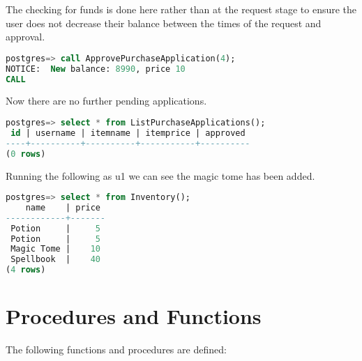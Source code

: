 The checking for funds is done here rather than at the request stage to ensure the user does not decrease their balance between
the times of the request and approval.

\begin{lstlisting}[language=SQL]
postgres=> call ApprovePurchaseApplication(4);
NOTICE:  New balance: 8990, price 10
CALL
\end{lstlisting}

Now there are no further pending applications.

\begin{lstlisting}[language=SQL]
postgres=> select * from ListPurchaseApplications();
 id | username | itemname | itemprice | approved 
----+----------+----------+-----------+----------
(0 rows)
\end{lstlisting}

Running the following as u1 we can see the magic tome has been added.

\begin{lstlisting}[language=SQL]
postgres=> select * from Inventory();
    name    | price 
------------+-------
 Potion     |     5
 Potion     |     5
 Magic Tome |    10
 Spellbook  |    40
(4 rows)
\end{lstlisting}


\section{Procedures and Functions}

The following functions and procedures are defined:

